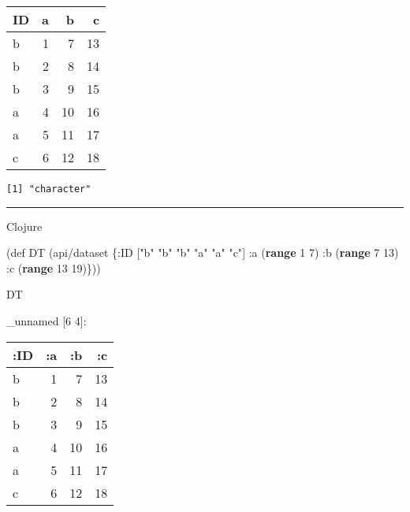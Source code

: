 \documentclass[]{article}
\newenvironment{Shaded}{\begin{snugshade}}{\end{snugshade}}
\newcommand{\KeywordTok}[1]{\textcolor[rgb]{0.13,0.29,0.53}{\textbf{#1}}}
\newcommand{\DecValTok}[1]{\textcolor[rgb]{0.00,0.00,0.81}{#1}}
\newcommand{\StringTok}[1]{\textcolor[rgb]{0.31,0.60,0.02}{#1}}
\newcommand{\FunctionTok}[1]{\textcolor[rgb]{0.00,0.00,0.00}{#1}}
\newcommand{\OperatorTok}[1]{\textcolor[rgb]{0.81,0.36,0.00}{\textbf{#1}}}
\newcommand{\BuiltInTok}[1]{#1}
\newcommand{\AttributeTok}[1]{\textcolor[rgb]{0.77,0.63,0.00}{#1}}
\newcommand{\NormalTok}[1]{#1}
\begin{document}
\begin{longtable}[]{@{}lrrr@{}}
\toprule
ID & a & b & c\tabularnewline
\midrule
\endhead
b & 1 & 7 & 13\tabularnewline
b & 2 & 8 & 14\tabularnewline
b & 3 & 9 & 15\tabularnewline
a & 4 & 10 & 16\tabularnewline
a & 5 & 11 & 17\tabularnewline
c & 6 & 12 & 18\tabularnewline
\bottomrule
\end{longtable}

\begin{Shaded}
\end{Shaded}

\begin{verbatim}
[1] "character"
\end{verbatim}

\begin{center}\rule{0.5\linewidth}{0.5pt}\end{center}

Clojure

\begin{Shaded}
\begin{Highlighting}[]
\NormalTok{(}\BuiltInTok{def}\FunctionTok{ DT }\NormalTok{(api/dataset \{}\AttributeTok{:ID}\NormalTok{ [}\StringTok{"b"} \StringTok{"b"} \StringTok{"b"} \StringTok{"a"} \StringTok{"a"} \StringTok{"c"}\NormalTok{]}
                      \AttributeTok{:a}\NormalTok{ (}\KeywordTok{range} \DecValTok{1} \DecValTok{7}\NormalTok{)}
                      \AttributeTok{:b}\NormalTok{ (}\KeywordTok{range} \DecValTok{7} \DecValTok{13}\NormalTok{)}
                      \AttributeTok{:c}\NormalTok{ (}\KeywordTok{range} \DecValTok{13} \DecValTok{19}\NormalTok{)\}))}
\end{Highlighting}
\end{Shaded}

\begin{Shaded}
\begin{Highlighting}[]
\NormalTok{DT}
\end{Highlighting}
\end{Shaded}

\_unnamed {[}6 4{]}:

\begin{longtable}[]{@{}lrrr@{}}
\toprule
:ID & :a & :b & :c\tabularnewline
\midrule
\endhead
b & 1 & 7 & 13\tabularnewline
b & 2 & 8 & 14\tabularnewline
b & 3 & 9 & 15\tabularnewline
a & 4 & 10 & 16\tabularnewline
a & 5 & 11 & 17\tabularnewline
c & 6 & 12 & 18\tabularnewline
\bottomrule
\end{longtable}
\end{document}
